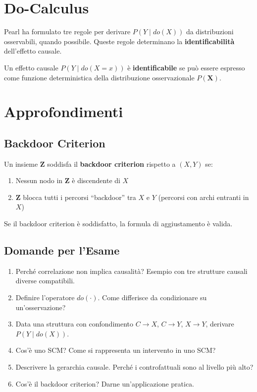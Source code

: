 \section{Do-Calculus}

Pearl ha formulato tre regole per derivare $P(Y \mid do(X))$ da distribuzioni osservabili, quando possibile. Queste regole determinano la \textbf{identificabilità} dell'effetto causale.

\begin{definition}
Un effetto causale $P(Y \mid do(X=x))$ è \textbf{identificabile} se può essere espresso come funzione deterministica della distribuzione osservazionale $P(\mathbf{X})$.
\end{definition}

\section{Approfondimenti}

\subsection{Backdoor Criterion}
Un insieme $\mathbf{Z}$ soddisfa il \textbf{backdoor criterion} rispetto a $(X, Y)$ se:
\begin{enumerate}
    \item Nessun nodo in $\mathbf{Z}$ è discendente di $X$
    \item $\mathbf{Z}$ blocca tutti i percorsi ``backdoor'' tra $X$ e $Y$ (percorsi con archi entranti in $X$)
\end{enumerate}
Se il backdoor criterion è soddisfatto, la formula di aggiustamento è valida.

\subsection{Domande per l'Esame}
\begin{enumerate}
    \item Perché correlazione non implica causalità? Esempio con tre strutture causali diverse compatibili.
    \item Definire l'operatore $do(\cdot)$. Come differisce da condizionare su un'osservazione?
    \item Data una struttura con confondimento $C \to X$, $C \to Y$, $X \to Y$, derivare $P(Y \mid do(X))$.
    \item Cos'è uno SCM? Come si rappresenta un intervento in uno SCM?
    \item Descrivere la gerarchia causale. Perché i controfattuali sono al livello più alto?
    \item Cos'è il backdoor criterion? Darne un'applicazione pratica.
\end{enumerate}

